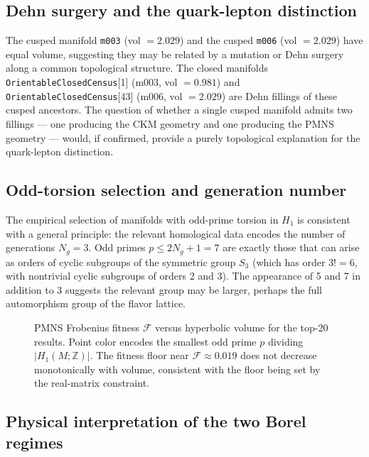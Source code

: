 \documentclass[11pt,a4paper]{article}
\begin{document}
\subsection{Dehn surgery and the quark-lepton distinction}

The cusped manifold \texttt{m003} (vol $= 2.029$) and the cusped
\texttt{m006} (vol $= 2.029$) have equal volume, suggesting they
may be related by a mutation or Dehn surgery along a common
topological structure. The closed manifolds
\texttt{OrientableClosedCensus}[1] (m003, vol $= 0.981$) and
\texttt{OrientableClosedCensus}[43] (m006, vol $= 2.029$) are
Dehn fillings of these cusped ancestors.
The question of whether a single cusped manifold admits two fillings
--- one producing the CKM geometry and one producing the PMNS
geometry --- would, if confirmed, provide a purely topological
explanation for the quark-lepton distinction.

\subsection{Odd-torsion selection and generation number}

The empirical selection of manifolds with odd-prime torsion in $H_1$
is consistent with a general principle: the relevant homological
data encodes the number of generations $N_g = 3$.
Odd primes $p \leq 2N_g + 1 = 7$ are exactly those that can arise
as orders of cyclic subgroups of the symmetric group $S_3$
(which has order $3! = 6$, with nontrivial cyclic subgroups of
orders 2 and 3).
The appearance of 5 and 7 in addition to 3 suggests the relevant
group may be larger, perhaps the full automorphism group of the
flavor lattice.


\begin{figure}[!t]
\centering
\caption{PMNS Frobenius fitness $\mathcal{F}$ versus hyperbolic volume
for the top-20 results. Point color encodes the smallest odd prime $p$
dividing $|H_1(M;\mathbb{Z})|$. The fitness floor near
$\mathcal{F} \approx 0.019$ does not decrease monotonically with volume,
consistent with the floor being set by the real-matrix constraint.}
\label{fig:floor_volume}
\end{figure}




\subsection{Physical interpretation of the two Borel regimes}
\label{sec:discuss_regimes}
 
\end{document}
